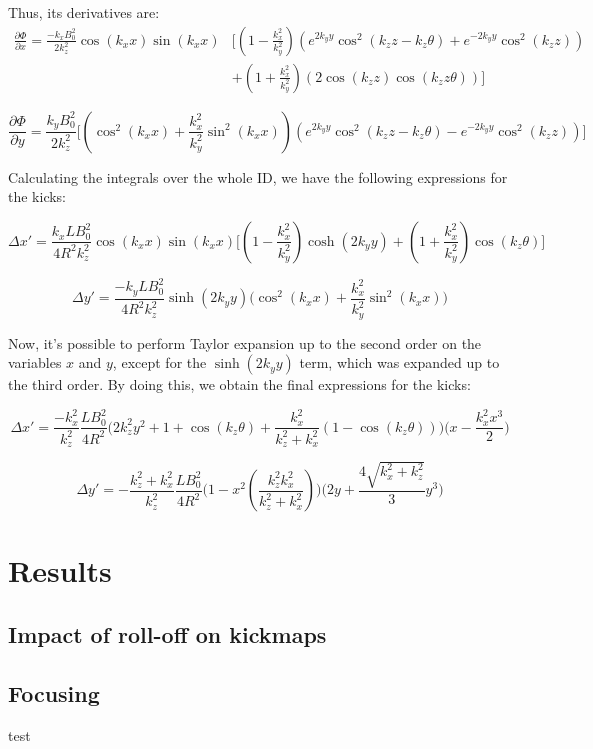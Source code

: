 \documentclass{article}
\begin{document}
Thus, its derivatives are:
\begin{equation}
\begin{split}
\frac{\partial\Phi}{\partial x} = \frac{-k_xB_0^2}{2k_z^2}\cos(k_xx)\sin(k_xx) & \bigg[\left(1-\frac{k_x^2}{k_y^2}\right)\left(e^{2k_yy}\cos^2(k_zz-k_z\theta) + e^{-2k_yy}\cos^2(k_zz)\right) \\
 & + \left(1+\frac{k_x^2}{k_y^2}\right)\left(2\cos(k_zz)\cos(k_zz\theta)\right)\bigg]
\end{split}
\end{equation}

\begin{equation}
\frac{\partial\Phi}{\partial y} = \frac{k_yB_0^2}{2k_z^2}\bigg[\left(\cos^2(k_xx)+\frac{k_x^2}{k_y^2}\sin^2(k_xx)\right)\left(e^{2k_yy}\cos^2(k_zz-k_z\theta) - e^{-2k_yy}\cos^2(k_zz)\right)\bigg]
\end{equation}
 
Calculating the integrals over the whole ID, we have the following expressions for the kicks:

\begin{equation}
\Delta x' = \frac{k_xLB_0^2}{4R^2k_z^2}\cos(k_xx)\sin(k_xx)\bigg[\left(1-\frac{k_x^2}{k_y^2}\right)\cosh(2k_yy) + \left(1+\frac{k_x^2}{k_y^2}\right)\cos(k_z\theta) \bigg]
\end{equation}


\begin{equation}
\Delta y' = \frac{-k_yLB_0^2}{4R^2k_z^2}\sinh(2k_yy)\bigg(\cos^2(k_xx)+\frac{k_x^2}{k_y^2}\sin^2(k_xx)\bigg)
\end{equation}


Now, it's possible to perform Taylor expansion up to the second order on the variables $x$ and $y$, except for the $\sinh(2k_yy)$ term, which was expanded up to the third order. By doing this, we obtain the final expressions for the kicks:

\begin{equation}
\Delta x' = \frac{-k_x^2}{k_z^2}\frac{LB_0^2}{4R^2}\bigg(2k_z^2y^2+1+\cos(k_z\theta)+\frac{k_x^2}{k_z^2+k_x^2}\left(1-\cos(k_z\theta)\right)\bigg)\bigg(x-\frac{k_x^2x^3}{2}\bigg)
\end{equation}

\begin{equation}
\Delta y' = -\frac{k_z^2+k_x^2}{k_z^2}\frac{LB_0^2}{4R^2}\bigg(1-x^2\left(\frac{k_z^2k_x^2}{k_z^2+k_x^2}\right)\bigg)\bigg(2y +\frac{4\sqrt{k_x^2+k_z^2}}{3}y^3\bigg)
\end{equation}

\section{Results}
\subsection{Impact of roll-off on kickmaps}

\subsection{Focusing}
test
\end{document}
